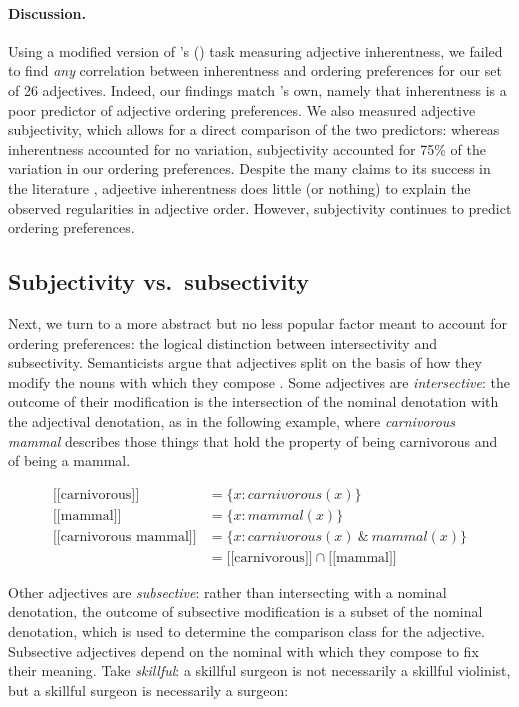 \documentclass[12pt]{article}
\newcommand{\sem}[1]{\mbox{$[\![$#1$]\!]$}}
\newcommand{\jd}[1]{\textcolor{red}{[jd: #1]}}
\begin{document}
\paragraph{Discussion.} Using a modified version of \citeauthor{martin1969}'s (\citeyear{martin1969}) task measuring adjective inherentness, we failed to find \emph{any} correlation between inherentness and ordering preferences for our set of 26 adjectives. Indeed, our findings match \citeauthor{martin1969}'s own, namely that inherentness is a poor predictor of adjective ordering preferences. %
We also measured adjective subjectivity, which allows for a direct comparison of the two predictors: whereas inherentness accounted for no variation, subjectivity accounted for 75\% of the variation in our ordering preferences. Despite the many claims to its success in the literature \citep[e.g.,][]{sweet1898,whorf1945,kemmerer2000}, adjective inherentness does little (or nothing) to explain the observed regularities in adjective order. However, subjectivity continues to predict ordering preferences.



\subsection{Subjectivity vs.~subsectivity}

Next, we turn to a more abstract but no less popular factor meant to account for ordering preferences: the logical distinction between intersectivity and subsectivity. Semanticists argue that adjectives split on the basis of how they modify the nouns with which they compose \citep[for discussion, see][]{kamppartee1995}. Some adjectives are \emph{intersective}: the outcome of their modification is the intersection of the nominal denotation with the adjectival denotation, as in the following example, where \emph{carnivorous mammal} describes those things that hold the property of being carnivorous and of being a mammal.

\begin{align*} 
\sem{carnivorous} &= \{x : carnivorous(x)\}\\
\sem{mammal} &= \{x : mammal(x)\}\\
\sem{carnivorous mammal} &= \{x : carnivorous(x)\ \&\ mammal(x)\}\\
& =\sem{carnivorous} \cap \sem{mammal}
\end{align*}

\noindent Other adjectives are \emph{subsective}: rather than intersecting with a nominal denotation, the outcome of subsective modification is a subset of the nominal denotation, which is used to determine the comparison class for the adjective. Subsective adjectives depend on the nominal with which they compose to fix their meaning. Take \emph{skillful}: a skillful surgeon is not necessarily a skillful violinist, but a skillful surgeon is necessarily a surgeon:
\end{document}
